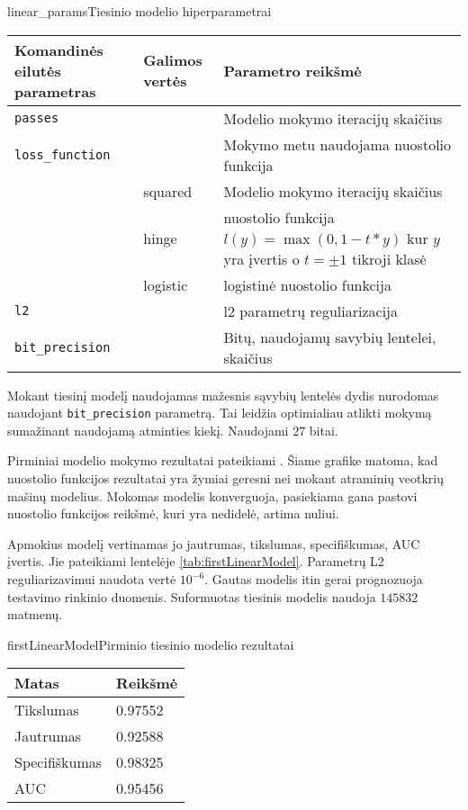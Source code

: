 \begin{ktutable}{linear_params}{Tiesinio modelio hiperparametrai}
    \begin{tabular}{| l | l | p{7cm}|}
    \hline
        Komandinės eilutės parametras & Galimos vertės & Parametro reikšmė\\ \hline
        \texttt{passes} &  & Modelio mokymo iteracijų skaičius \\ \hline
        \texttt{loss\_function} &          & Mokymo metu naudojama nuostolio funkcija \\
                               & squared  & Modelio mokymo iteracijų skaičius \\
                               & hinge    & nuostolio funkcija $l(y) = \max(0, 1 - t * y)$ kur $y$ yra įvertis o $t = \pm 1$ tikroji klasė  \\
                               & logistic & logistinė nuostolio funkcija \\ \hline
        \texttt{l2} & & l2 parametrų reguliarizacija \\ \hline
        \texttt{bit\_precision} & & Bitų, naudojamų savybių lentelei, skaičius\\ \hline
    \end{tabular}
\end{ktutable}

Mokant tiesinį modelį naudojamas mažesnis sąvybių lentelės dydis nurodomas naudojant \texttt{bit\_precision} parametrą. Tai leidžia optimialiau atlikti mokymą sumažinant naudojamą atminties kiekį. Naudojami $27$ bitai.

Pirminiai modelio mokymo rezultatai pateikiami . Šiame grafike matoma, kad nuostolio funkcijos rezultatai yra žymiai geresni nei mokant atraminių veotkrių mašinų modelius. Mokomas modelis konverguoja, pasiekiama gana pastovi nuostolio funkcijos reikšmė, kuri yra nedidelė, artima nuliui.


Apmokius modelį vertinamas jo jautrumas, tikslumas, specifiškumas, AUC įvertis. Jie pateikiami lentelėje \vref{tab:firstLinearModel}. Parametrų L2 reguliarizavimui naudota vertė $10^{-6}$.
Gautas modelis itin gerai prognozuoja testavimo rinkinio duomenis. Suformuotas tiesinis modelis naudoja
$145832$ matmenų.

\begin{ktutable}{firstLinearModel}{Pirminio tiesinio modelio rezultatai}
    \begin{tabular}{| l | l |}
    \hline
       Matas & Reikšmė \\ \hline
               Tikslumas & 0.97552 \\ \hline
               Jautrumas & 0.92588 \\ \hline
               Specifiškumas & 0.98325 \\ \hline
               AUC & 0.95456 \\ \hline
    \end{tabular}
\end{ktutable}

